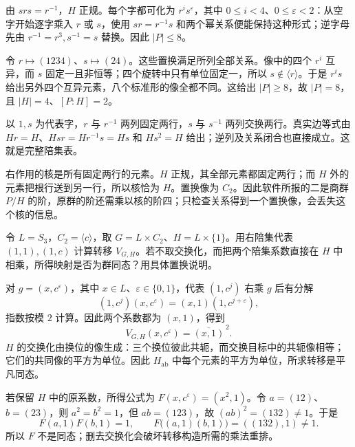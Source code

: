 \begin{solution}
	由 \(srs=r^{-1}\)，\(H\) 正规。每个字都可化为 \(r^i s^\varepsilon\)，其中 \(0\leq i<4\)、\(0\leq\varepsilon<2\)：从空字开始逐字乘入 \(r\) 或 \(s\)，使用 \(sr=r^{-1}s\) 和两个幂关系便能保持这种形式；逆字母先由 \(r^{-1}=r^3,s^{-1}=s\) 替换。因此 \(|P|\leq8\)。

	令 \(r\mapsto(1234)\)、\(s\mapsto(24)\)。这些置换满足所列全部关系。像中的四个 \(r^i\) 互异，而 \(s\) 固定一且非恒等；四个旋转中只有单位固定一，所以 \(s\notin\langle r\rangle\)。于是 \(r^is\) 给出另外四个互异元素，八个标准形的像全都不同。这给出 \(|P|\geq8\)，故 \(|P|=8\)，且 \(|H|=4\)、\([P:H]=2\)。

	以 \(1,s\) 为代表字，\(r\) 与 \(r^{-1}\) 两列固定两行，\(s\) 与 \(s^{-1}\) 两列交换两行。真实边等式由 \(Hr=H\)、\(Hsr=Hr^{-1}s=Hs\) 和 \(Hs^2=H\) 给出；逆列及关系闭合也直接成立。这就是完整陪集表。

	右作用的核是所有固定两行的元素。\(H\) 正规，其全部元素都固定两行；而 \(H\) 外的元素把根行送到另一行，所以核恰为 \(H\)。置换像为 \(C_2\)。因此软件所报的二是商群 \(P/H\) 的阶，原群的阶还需乘以核的阶四；只检查关系得到一个置换像，会丢失这个核的信息。
\end{solution}

\begin{exercise}\label{b1:ex:C-transfer-nonabelian-target}
	令 \(L=S_3\)，\(C_2=\langle c\rangle\)，取 \(G=L\times C_2\)、\(H=L\times\{1\}\)。用右陪集代表 \((1,1),(1,c)\) 计算转移 \(V_{G,H}\)。若不取交换化，而把两个陪集系数直接在 \(H\) 中相乘，所得映射是否为群同态？用具体置换说明。
\end{exercise}

\begin{solution}
	对 \(g=(x,c^\varepsilon)\)，其中 \(x\in L\)、\(\varepsilon\in\{0,1\}\)，代表 \((1,c^j)\) 右乘 \(g\) 后有分解
	\[
		(1,c^j)(x,c^\varepsilon)
		=(x,1)(1,c^{j+\varepsilon}),
	\]
	指数按模 \(2\) 计算。因此两个系数都为 \((x,1)\)，得到
	\[
		V_{G,H}(x,c^\varepsilon)=\overline{(x,1)}^{\,2}.
	\]
	\(H\) 的交换化由换位的像生成：三个换位彼此共轭，而交换目标中的共轭像相等；它们的共同像的平方为单位。因此 \(H_{\mathrm{ab}}\) 中每个元素的平方为单位，所求转移是平凡同态。

	若保留 \(H\) 中的原系数，所得公式为 \(F(x,c^\varepsilon)=(x^2,1)\)。令 \(a=(12)\)、\(b=(23)\)，则 \(a^2=b^2=1\)，但 \(ab=(123)\)，故 \((ab)^2=(132)\ne1\)。于是
	\[
		F(a,1)F(b,1)=1,
		\qquad F\bigl((a,1)(b,1)\bigr)=((132),1)\ne1.
	\]
	所以 \(F\) 不是同态；删去交换化会破坏转移构造所需的乘法重排。
\end{solution}

